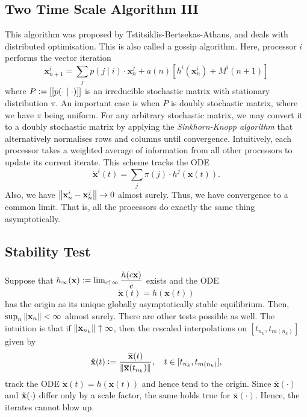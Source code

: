 \subsection{Two Time Scale Algorithm III}

This algorithm was proposed by Tstitsiklis-Bertsekas-Athans, and deals with distributed optimisation. This is also called a gossip algorithm. Here, processor $i$ performs the vector iteration
\[
    \mathbf{x}^i_{n+1} = \sum_j p(j \mid i) \cdot\mathbf{x}^j_n + a(n) \left[ h^i(\mathbf{x}^i_n) + M^i(n+1) \right]
\]
where $P \vcentcolon= [[ p(\cdot\mid\cdot)]]$ is an irreducible stochastic matrix with stationary distribution $\pi$. An important case is when $P$ is doubly stochastic matrix, where we have $\pi$ being uniform. For any arbitrary stochastic matrix, we may convert it to a doubly stochastic matrix by applying the \emph{Sinkhorn-Knopp algorithm} that alternatively normalises rows and columns until convergence. Intuitively, each processor takes a weighted average of information from all other processors to update its current iterate. This scheme tracks the ODE
\[
    \dot{\mathbf{x}}^i(t) = \sum_j \pi(j) \cdot h^j(\mathbf{x}(t)).
\]
Also, we have $\norm{\mathbf{x}^i_n - \mathbf{x}^j_n} \to 0$ almost surely. Thus, we have convergence to a common limit. That is, all the processors do exactly the same thing asymptotically. 

\subsection{Stability Test}

Suppose that $h_{\infty}(\mathbf{x}) \vcentcolon= \lim_{c \uparrow \infty} \dfrac{h(c\mathbf{x})}{c}$ exists and the ODE
\[
    \dot{\mathbf{x}}(t) = h(\mathbf{x}(t))
\]
has the origin as its unique globally asymptotically stable equilibrium. Then, $\sup_n \norm{\mathbf{x}_n} < \infty$ almost surely. There are other tests possible as well. The intuition is that if $\norm{\mathbf{x}_{n_k}} \uparrow \infty$, then the rescaled interpolations on $[t_{n_k}, t_{m(n_k)}]$ given by
\[
    \Check{\mathbf{x}}(t) \vcentcolon= \frac{\overline{\mathbf{x}}(t)}{\norm{\overline{\mathbf{x}}(t_{n_k})}}, \quad t \in [t_{n_k}, t_{m(n_k)}],
\]
track the ODE $\dot{\mathbf{x}}(t) = h(\mathbf{x}(t))$ and hence tend to the origin. Since $\overline{\mathbf{x}}(\cdot)$ and $\Check{\mathbf{x}}(\cdot)$ differ only by a scale factor, the same holds true for $\overline{\mathbf{x}}(\cdot)$. Hence, the iterates cannot blow up. 

